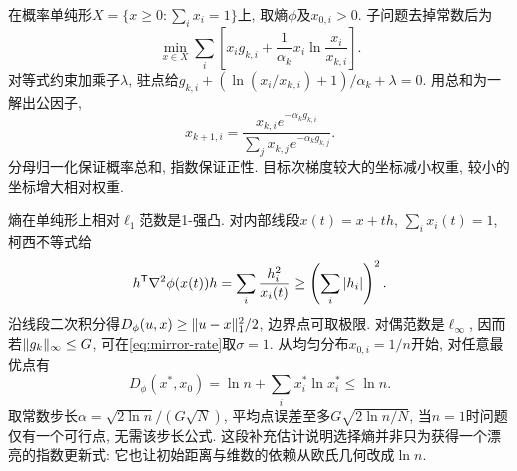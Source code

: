 在概率单纯形$X=\{x\ge0:\sum_i x_i=1\}$上, 取熵$\phi$及$x_{0,i}>0$. 子问题去掉常数后为
\[
 \min_{x\in X}\sum_i\left[x_i g_{k,i}+\frac1{\alpha_k}x_i\ln\frac{x_i}{x_{k,i}}\right].
\]
对等式约束加乘子$\lambda$, 驻点给$g_{k,i}+(\ln(x_i/x_{k,i})+1)/\alpha_k+\lambda=0$. 用总和为一解出公因子,
\begin{equation}\label{eq:entropy-mirror-update}
 x_{k+1,i}=\frac{x_{k,i}e^{-\alpha_k g_{k,i}}}{\sum_jx_{k,j}e^{-\alpha_k g_{k,j}}}.
\end{equation}
分母归一化保证概率总和, 指数保证正性. 目标次梯度较大的坐标减小权重, 较小的坐标增大相对权重.

熵在单纯形上相对$\ell_1$范数是1-强凸. 对内部线段$x(t)=x+th$, $\sum_i x_i(t)=1$, 柯西不等式给
\[
 h^{\mathsf T}\nabla^2\phi(x(t))h=\sum_i\frac{h_i^2}{x_i(t)}\ge\left(\sum_i|h_i|\right)^2.
\]
沿线段二次积分得$D_\phi(u,x)\ge\lVert u-x\rVert_1^2/2$, 边界点可取极限. 对偶范数是$\ell_\infty$, 因而若$\lVert g_k\rVert_\infty\le G$, 可在\eqref{eq:mirror-rate}取$\sigma=1$. 从均匀分布$x_{0,i}=1/n$开始, 对任意最优点有
\[
 D_\phi(x^*,x_0)=\ln n+\sum_i x_i^*\ln x_i^*\le\ln n.
\]
取常数步长$\alpha=\sqrt{2\ln n}/(G\sqrt N)$, 平均点误差至多$G\sqrt{2\ln n/N}$, 当$n=1$时问题仅有一个可行点, 无需该步长公式. 这段补充估计说明选择熵并非只为获得一个漂亮的指数更新式: 它也让初始距离与维数的依赖从欧氏几何改成$\ln n$.
